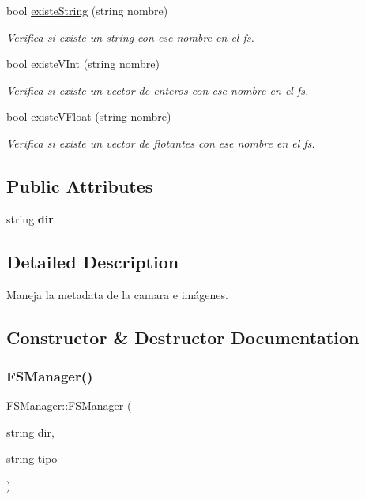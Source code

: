 \begin{DoxyCompactItemize}
bool \mbox{\hyperlink{classFSManager_a0756a23591bc8fcd3c40a58af9881d34}{existe\+String}} (string nombre)
\begin{DoxyCompactList}\small\item\em Verifica si existe un string con ese nombre en el fs. \end{DoxyCompactList}\item 
bool \mbox{\hyperlink{classFSManager_a500170a86c9fcaddd716fe962283742c}{existe\+V\+Int}} (string nombre)
\begin{DoxyCompactList}\small\item\em Verifica si existe un vector de enteros con ese nombre en el fs. \end{DoxyCompactList}\item 
bool \mbox{\hyperlink{classFSManager_a63759864d11b386395f462a7876c2e89}{existe\+V\+Float}} (string nombre)
\begin{DoxyCompactList}\small\item\em Verifica si existe un vector de flotantes con ese nombre en el fs. \end{DoxyCompactList}\end{DoxyCompactItemize}
\subsection*{Public Attributes}
\begin{DoxyCompactItemize}
\item 
\mbox{\label{classFSManager_a1458ba7e170d083b28861dda8167263b}} 
string {\bfseries dir}
\end{DoxyCompactItemize}


\subsection{Detailed Description}
Maneja la metadata de la camara e imágenes. 

\subsection{Constructor \& Destructor Documentation}
\mbox{\label{classFSManager_a888db17ac3bf2a22dfa6a18b6fed99d8}} 
\subsubsection{\texorpdfstring{F\+S\+Manager()}{FSManager()}}
{\footnotesize\ttfamily F\+S\+Manager\+::\+F\+S\+Manager (\begin{DoxyParamCaption}\item[{string}]{dir,  }\item[{string}]{tipo }\end{DoxyParamCaption})\hspace{0.3cm}{\ttfamily [inline]}}



